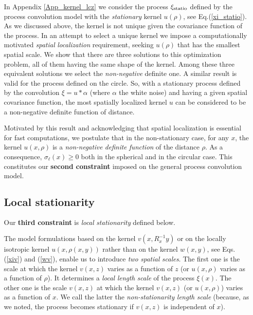 \documentclass[12pt]{article}
\begin{document}
In Appendix \ref{App_kernel_lcz} we consider the process $\xi_{\rm statio}$ defined 
by the process convolution model with the {\em stationary} kernel $u(\rho)$, see Eq.(\ref{xi_statio}).
As we discussed above, the kernel is not unique given the covariance function of the process. 
In an attempt to select a unique  kernel we impose a computationally motivated 
{\em spatial localization} requirement, seeking $u(\rho)$  that has the smallest spatial scale.
We show that there are three solutions to this optimization problem,  all of them having the same
shape of the kernel.
Among these three equivalent solutions we select the {\em non-negative} definite one.
A similar result is valid for the process defined on the circle.
So, with a stationary process  
defined by the convolution $\xi=u*\alpha$
(where  $\alpha$ the white noise) and having a given spatial covariance function,
the most spatially localized kernel $u$
can be considered to be a  non-negative definite function of distance.

Motivated by this result and acknowledging that spatial localization is essential for fast computations, 
we postulate that in the non-stationary case, for any $x$, the 
kernel $u(x,\rho)$ is a {\em non-negative definite function} of the distance $\rho$.
As a consequence, $\sigma_\ell(x) \ge 0$  both in the spherical and 
in the circular case.
This constitutes our {\bf  second constraint} imposed on the general 
process convolution model.






\subsection {Local stationarity}
\label{sec_LSM_locsta}


Our {\bf  third constraint} is {\em local stationarity} defined below.

The model formulations based on the kernel $v(x,R_x^{-1} y)$ or on the locally isotropic kernel 
$u(x, \rho(x,y))$ rather than on the kernel $w(x,y)$, see Eqs.(\ref{xiv}) and (\ref{wv}), 
enable us to introduce {\em two spatial scales}. The first one is the scale at which
the kernel $v(x,z)$  varies as a function of $z$ (or $u(x, \rho)$ varies as a function of $\rho$).
It determines a {\em local length scale} of the process $\xi(x)$.
The other one is the scale $v(x,z)$  at which
the kernel $v(x,z)$ (or $u(x, \rho)$) varies as a function of  $x$.
We call the latter the {\em non-stationarity length scale}  (because, as we noted,
the process becomes stationary if $v(x,z)$ is independent of $x$).
\end{document}
